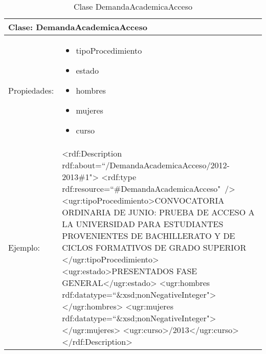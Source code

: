 \begin{table}[!ht]
	\centering
	\begin{tabular}{|p{}|p{}|}
		\hline
		\multicolumn{2}{|l|}{Clase: \textbf{DemandaAcademicaAcceso}}
		\\ \hline
		Propiedades:&
		\begin{itemize}
			\item tipoProcedimiento
			\item estado
			\item hombres
			\item mujeres
			\item curso
		\end{itemize}
		\\ \hline
		Ejemplo:&
		\textless rdf:Description \newline
		\tab rdf:about=``/DemandaAcademicaAcceso/2012-2013\#1"\textgreater \newline
		\tab \textless rdf:type rdf:resource=``\#DemandaAcademicaAcceso"\ /\textgreater \newline
		\tab \textless ugr:tipoProcedimiento\textgreater \newline\tab\tab CONVOCATORIA ORDINARIA DE JUNIO: PRUEBA DE ACCESO A LA UNIVERSIDAD PARA ESTUDIANTES PROVENIENTES DE BACHILLERATO Y DE CICLOS FORMATIVOS DE GRADO SUPERIOR \newline\tab\textless /ugr:tipoProcedimiento\textgreater \newline
		\tab \textless ugr:estado\textgreater \newline\tab\tab PRESENTADOS FASE GENERAL\newline\tab\textless /ugr:estado\textgreater  \newline
		\tab \textless ugr:hombres rdf:datatype=``\&xsd;nonNegativeInteger"\textgreater \newline\tab\tab2264 \newline \tab \textless /ugr:hombres\textgreater \newline
		\tab \textless ugr:mujeres rdf:datatype=``\&xsd;nonNegativeInteger"\textgreater \newline\tab\tab2877 \newline \tab \textless /ugr:mujeres\textgreater  \newline
		\tab \textless ugr:curso\textgreater \newline\tab\tab2012/2013\newline\tab\textless /ugr:curso\textgreater  \newline
		\textless /rdf:Description\textgreater 
		\\ \hline
	\end{tabular}
	\caption{Clase DemandaAcademicaAcceso}
	\label{clase-demandaacademicaacceso}
\end{table}

